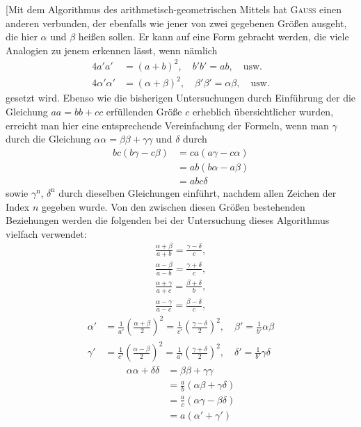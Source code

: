 [Mit dem Algorithmus des arithmetisch-geometrischen Mittels hat \textsc{Gauss} einen anderen verbunden, der ebenfalls wie jener von zwei gegebenen Größen ausgeht, die hier $\alpha$ und $\beta$ heißen sollen. Er kann auf eine Form gebracht werden, die viele Analogien zu jenem erkennen lässt, wenn nämlich
\[
\begin{aligned}
4a'a'&=(a+b)^2,\quad b'b'=ab,\quad\text{usw.}\\
4\alpha'\alpha'&=(\alpha+\beta)^2,\quad\beta'\beta'=\alpha\beta,\quad\text{usw.}
\end{aligned}
\]
gesetzt wird. Ebenso wie die bisherigen Untersuchungen durch Einführung der die Gleichung $aa=bb+cc$ erfüllenden Größe $c$ erheblich übersichtlicher wurden, erreicht man hier eine entsprechende Vereinfachung der Formeln, wenn man $\gamma$ durch die Gleichung $\alpha\alpha=\beta\beta+\gamma\gamma$ und $\delta$ durch
\[
\begin{aligned}bc(b\gamma-c\beta)&=ca(a\gamma-c\alpha)\\&=ab(b\alpha-a\beta)\\&=abc\delta\end{aligned}
\]
sowie $\gamma^{\mathrm n}$, $\delta^{\mathrm n}$ durch dieselben Gleichungen einführt, nachdem allen Zeichen der Index $n$ gegeben wurde. Von den zwischen diesen Größen bestehenden Beziehungen werden die folgenden bei der Untersuchung dieses Algorithmus vielfach verwendet:
\[
\begin{gathered}\frac{\alpha+\beta}{a+b}=\frac{\gamma-\delta}{c},\\[5pt]
\frac{\alpha-\beta}{a-b}=\frac{\gamma+\delta}{c},\\[5pt]
\frac{\alpha+\gamma}{a+c}=\frac{\beta+\delta}{b},\\[5pt]
\frac{\alpha-\gamma}{a-c}=\frac{\beta-\delta}{c},\end{gathered}
\]
\[
\begin{aligned}
\alpha'&=\frac1{a'}\left(\frac{\alpha+\beta}{2}\right)^2
=\frac1{c'}\left(\frac{\gamma-\delta}{2}\right)^2,\quad
\beta'=\frac1{b'}\alpha\beta\\
\gamma'&=\frac1{c'}\left(\frac{\alpha-\beta}{2}\right)^2
=\frac1{a'}\left(\frac{\gamma+\delta}{2}\right)^2,\quad
\delta'=\frac1{b'}\gamma\delta
\end{aligned}
\]
\[
\begin{aligned}\alpha\alpha+\delta\delta&=\beta\beta+\gamma\gamma
\\&=\frac ab(\alpha\beta+\gamma\delta)\\&=\frac ac(\alpha\gamma-\beta\delta)
\\&=a(\alpha'+\gamma')\end{aligned}
\]
